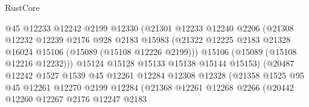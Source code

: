 \begin{lexlean}{RustCore}
\begin{coremodule}
                                  @45
                                  @12233
                                  @12242
                                  @2199
                                  @12330
                                  (@21301
                                    @12233
                                    @12240
                                    @2206
                                    (@21308
                                      @12232
                                      @12239
                                      @2176
                                      @928
                                      @2183
                                      @15983
                                      (@21322
                                        @12225
                                        @2183
                                        @21328
                                        @16024
                                        @15106
                                        (@15089 (@15108 @12226 @2199)))
                                      @15106
                                      (@15089 (@15108 @12216 @12232)))
                                    @15124
                                    @15128
                                    @15133
                                    @15138
                                    @15144
                                    @15153)
                                  (@20487
                                    @12242
                                    @1527
                                    @1539
                                    @45
                                    @12261
                                    @12284
                                    @12308
                                    @12328
                                    (@21358
                                      @1525
                                      @95
                                      @45
                                      @12261
                                      @12270
                                      @2199
                                      @12284
                                      (@21368
                                        @12261
                                        @12268
                                        @2266
                                        (@20442
                                          @12260
                                          @12267
                                          @2176
                                          @12247
                                          @2183

\end{coremodule}
\end{lexlean}

